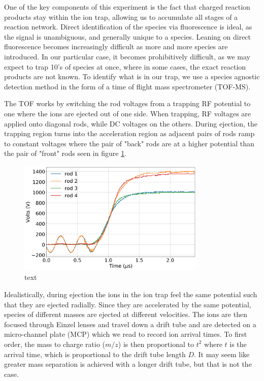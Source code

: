 One of the key components of this experiment is the fact that charged reaction products stay within the ion trap, allowing us to accumulate all stages of a reaction network. Direct identification of the species via fluorescence is ideal, as the signal is unambiguous, and generally unique to a species. Leaning on direct fluorescence becomes increasingly difficult as more and more species are introduced. In our particular case, it becomes prohibitively difficult, as we may expect to trap 10's of species at once, where in some cases, the exact reaction products are not known. To identify what is in our trap, we use a species agnostic detection method in the form of a time of flight mass spectrometer (TOF-MS).

The TOF works by switching the rod voltages from a trapping RF potential to one where the ions are ejected out of one side. When trapping, RF voltages are applied onto diagonal rods, while DC voltages on the others. During ejection, the trapping region turns into the acceleration region as adjacent pairs of rods ramp to constant voltages where the pair of "back" rods are at a higher potential than the pair of "front" rods seen in figure \ref{fig: rod traces}.

\begin{figure}[H]
	\centering
	\includegraphics[width=0.8\textwidth]{images/rod_traces.png}
	\caption{text}
	\label{fig: rod traces}
\end{figure}

Idealistically, during ejection the ions in the ion trap feel the same potential such that they are ejected radially. Since they are accelerated by the same potential, species of different masses are ejected at different velocities. The ions are then focused through Einzel lenses and travel down a drift tube and are detected on a micro-channel plate (MCP) which we read to record ion arrival times. To first order, the mass to charge ratio ($m/z$) is then proportional to $t^2$ where $t$ is the arrival time, which is proportional to the drift tube length $D$. It may seem like greater mass separation is achieved with a longer drift tube, but that is not the case.

